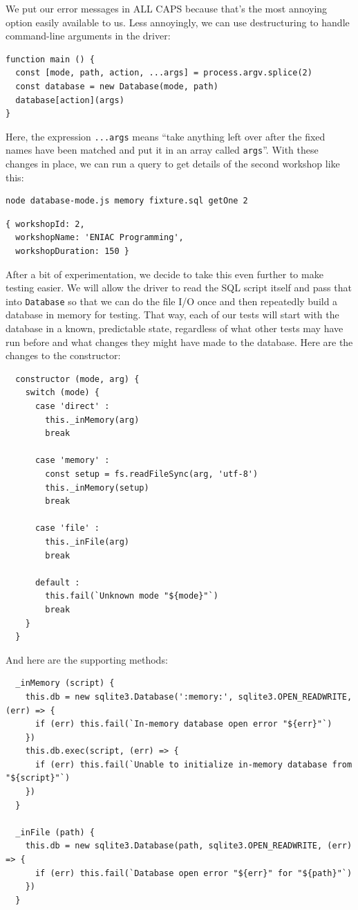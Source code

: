 We put our error messages in ALL CAPS because that's the most annoying
option easily available to us. Less annoyingly, we can use destructuring
to handle command-line arguments in the driver:

\begin{verbatim}
function main () {
  const [mode, path, action, ...args] = process.argv.splice(2)
  const database = new Database(mode, path)
  database[action](args)
}
\end{verbatim}

Here, the expression \texttt{...args} means ``take anything left over
after the fixed names have been matched and put it in an array called
\texttt{args}''. With these changes in place, we can run a query to get
details of the second workshop like this:

\begin{verbatim}
node database-mode.js memory fixture.sql getOne 2
\end{verbatim}

\begin{verbatim}
{ workshopId: 2,
  workshopName: 'ENIAC Programming',
  workshopDuration: 150 }
\end{verbatim}

After a bit of experimentation, we decide to take this even further to
make testing easier. We will allow the driver to read the SQL script
itself and pass that into \texttt{Database} so that we can do the file
I/O once and then repeatedly build a database in memory for testing.
That way, each of our tests will start with the database in a known,
predictable state, regardless of what other tests may have run before
and what changes they might have made to the database. Here are the
changes to the constructor:

\begin{verbatim}
  constructor (mode, arg) {
    switch (mode) {
      case 'direct' :
        this._inMemory(arg)
        break

      case 'memory' :
        const setup = fs.readFileSync(arg, 'utf-8')
        this._inMemory(setup)
        break

      case 'file' :
        this._inFile(arg)
        break

      default :
        this.fail(`Unknown mode "${mode}"`)
        break
    }
  }
\end{verbatim}

And here are the supporting methods:

\begin{verbatim}
  _inMemory (script) {
    this.db = new sqlite3.Database(':memory:', sqlite3.OPEN_READWRITE, (err) => {
      if (err) this.fail(`In-memory database open error "${err}"`)
    })
    this.db.exec(script, (err) => {
      if (err) this.fail(`Unable to initialize in-memory database from "${script}"`)
    })
  }

  _inFile (path) {
    this.db = new sqlite3.Database(path, sqlite3.OPEN_READWRITE, (err) => {
      if (err) this.fail(`Database open error "${err}" for "${path}"`)
    })
  }
\end{verbatim}

